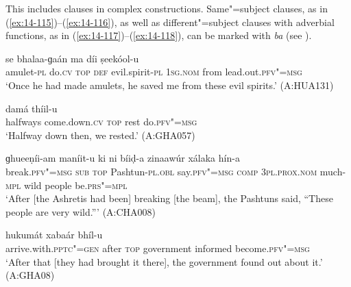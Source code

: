 This includes clauses in complex constructions. Same"=subject clauses, as in (\ref{ex:14-115})--(\ref{ex:14-116}), as well as different"=subject clauses with adverbial functions, as in (\ref{ex:14-117})--(\ref{ex:14-118}), can be marked with \textit{ba} (see ).

\begin{exe}
\ex
\label{ex:14-115}
 se bhalaa-ɡaán ma  díi ṣeekóol-u \\
amulet-\textsc{pl} do.\textsc{cv} \textsc{top} \textsc{def} evil.spirit-\textsc{pl} \textsc{1sg.nom} from lead.out.\textsc{pfv"=msg}{\protect\footnotemark} \\
\glt `Once he had made amulets, he saved me from these evil spirits.' (A:HUA131)

\ex
\label{ex:14-116}
 damá thíil-u \\
halfways come.down.\textsc{cv} \textsc{top} rest do.\textsc{pfv"=msg } \\
\glt `Halfway down then, we rested.' (A:GHA057)

\ex
\label{ex:14-117}
\gll [phooṭóol-u ta ba] ɡhueeṇíi-am maníit-u  ki ni bíiḍ-a zinaawúr
xálaka  hín-a \\
break.\textsc{pfv"=msg} \textsc{sub} \textsc{top} Pashtun-\textsc{pl.obl} say.\textsc{pfv"=msg}  \textsc{comp} \textsc{3pl.prox.nom} much-\textsc{mpl} wild people be.\textsc{prs"=mpl } \\
\glt `After [the Ashretis had been] breaking [the beam], the Pashtuns said, ``These people are very wild.''' (A:CHA008)

\ex
\label{ex:14-118}
\gll [phedóol"=ii pahúrta ba] hukumát xabaár  bhíl-u\\
arrive.with.\textsc{pptc"=gen} after \textsc{top} government informed become.\textsc{pfv"=msg}\\
\glt `After that [they had brought it there], the government found out about it.' (A:GHA08)
\end{exe}

